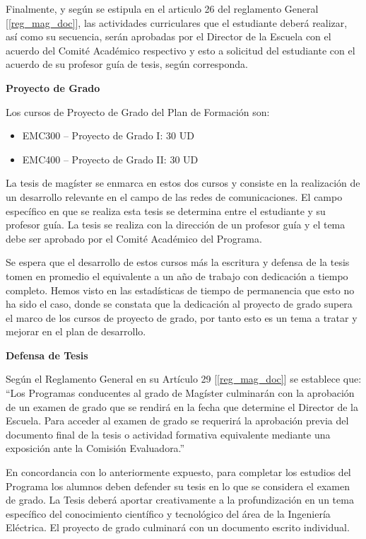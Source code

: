 Finalmente, y según se estipula en el articulo 26 del reglamento General [\ref{reg_mag_doc}], las actividades
curriculares que el estudiante deberá realizar, así como su secuencia, serán aprobadas por el
Director de la Escuela con el acuerdo del Comité Académico respectivo y esto a solicitud del
estudiante con el acuerdo de su profesor guía de tesis, según corresponda.

\noindent\textbf{Proyecto de Grado}

Los cursos de Proyecto de Grado del Plan de Formación son:

\begin{itemize}
\item EMC300 – Proyecto de Grado I: 30 UD
\item EMC400 – Proyecto de Grado II: 30 UD
\end{itemize}

La tesis de magíster se enmarca en estos dos cursos y consiste en la realización de un
desarrollo relevante en el campo de las redes de comunicaciones. El campo específico en que se
realiza esta tesis se determina entre el estudiante y su profesor guía. La tesis se realiza 
con la dirección de un profesor guía y el tema debe ser aprobado por el Comité Académico del Programa.

Se espera que el desarrollo de estos cursos más la escritura y defensa de la tesis tomen en
promedio el equivalente a un año de trabajo con dedicación a tiempo completo. Hemos visto
en las estadísticas de tiempo de permanencia que esto no ha sido el caso, donde se constata que
la dedicación al proyecto de grado supera el marco de los cursos de proyecto de grado, por tanto 
esto es un tema a tratar y mejorar en el plan de desarrollo. 

\noindent\textbf{Defensa de Tesis}

Según el Reglamento General en su Artículo 29 [\ref{reg_mag_doc}] se establece que:
``Los Programas conducentes al grado de Magíster culminarán con la aprobación de un examen
de grado que se rendirá en la fecha que determine el Director de la Escuela. Para acceder al
examen de grado se requerirá la aprobación previa del documento final de la tesis o actividad
formativa equivalente mediante una exposición ante la Comisión Evaluadora.''

En concordancia con lo anteriormente expuesto, para completar los estudios del Programa los
alumnos deben defender su tesis en lo que se considera el examen de grado. La Tesis deberá
aportar creativamente a la profundización en un tema específico del conocimiento científico y
tecnológico del área de la Ingeniería Eléctrica. El proyecto de grado culminará con un documento
escrito individual.

